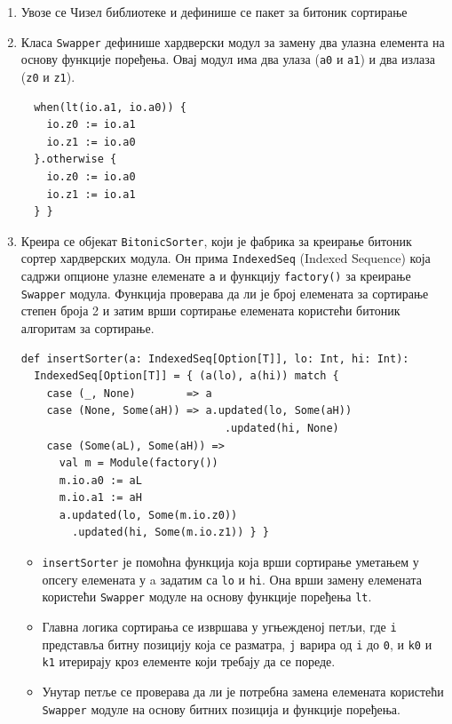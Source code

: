 \documentclass[12pt, a4paper]{article}
\theoremstyle{definition}
\begin{document}
\begin{enumerate}
\item Увозе се Чизел библиотеке и дефинише се пакет за битоник сортирање

\item Класа \verb+Swapper+ дефинише хардверски модул за замену два улазна елемента на основу функције поређења. Овај модул има два улаза (\verb+a0+ и \verb+a1+) и два излаза (\verb+z0+ и \verb+z1+).
\begin{verbatim}
  when(lt(io.a1, io.a0)) {
    io.z0 := io.a1
    io.z1 := io.a0
  }.otherwise {
    io.z0 := io.a0
    io.z1 := io.a1
  } }
\end{verbatim}


\item Креира се објекат \verb+BitonicSorter+, који је фабрика за креирање битоник сортер хардверских модула. Он прима \verb+IndexedSeq+ (Indexed Sequence) која садржи опционе улазне елеменате \verb+a+ и функцију \verb+factory()+ за креирање \verb+Swapper+ модула. Функција проверава да ли је број елемената за сортирање степен броја 2 и затим врши сортирање елемената користећи битоник алгоритам за сортирање.
\begin{verbatim}
def insertSorter(a: IndexedSeq[Option[T]], lo: Int, hi: Int):
  IndexedSeq[Option[T]] = { (a(lo), a(hi)) match {
    case (_, None)        => a
    case (None, Some(aH)) => a.updated(lo, Some(aH))
                                .updated(hi, None)
    case (Some(aL), Some(aH)) =>
      val m = Module(factory())
      m.io.a0 := aL
      m.io.a1 := aH
      a.updated(lo, Some(m.io.z0))
        .updated(hi, Some(m.io.z1)) } }
\end{verbatim}
\begin{itemize}
\item \verb+insertSorter+ је помоћна функција која врши сортирање уметањем у опсегу елемената у a задатим са \verb+lo+ и \verb+hi+. Она врши замену елемената користећи \verb+Swapper+ модуле на основу функције поређења \verb+lt+.

\item Главна логика сортирања се извршава у угњежденој петљи, где \verb+i+ представља битну позицију која
се разматра, \verb+j+ варира од \verb+i+ до \verb+0+, и \verb+k0+ и \verb+k1+ итерирају кроз елементе који требају да се пореде.

\item Унутар петље се проверава да ли је потребна замена елемената користећи \verb+Swapper+ модуле на основу битних позиција и функције поређења.


\end{itemize}
\end{enumerate}
\end{document}

